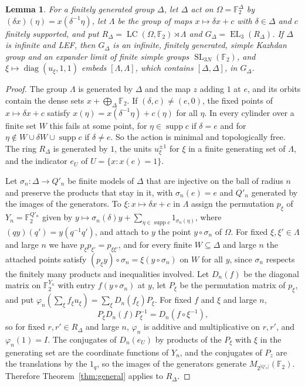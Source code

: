 \documentclass[11pt]{amsart}
\newtheorem{lemma}{Lemma}
\newcommand{\F}{\mathbb F}
\newcommand{\LC}{\operatorname{LC}}
\newcommand{\EL}{\operatorname{EL}}
\newcommand{\SL}{\operatorname{SL}}
\begin{document}
\begin{lemma}\label{lem:host}
For a finitely generated group $\Delta$, let $\Delta$ act on
$\Omega=\F_2^{\Delta}$ by $(\delta x)(\eta)=x(\delta^{-1}\eta)$, let
$\Lambda$ be the group of maps $x\mapsto\delta x+c$ with $\delta\in\Delta$
and $c$ finitely supported, and put
$R_\Delta=\LC(\Omega,\F_2)\rtimes\Lambda$ and $G_\Delta=\EL_3(R_\Delta)$.
If $\Delta$ is infinite and LEF, then $G_\Delta$ is an infinite, finitely
generated, simple Kazhdan group and an expander limit of finite simple
groups $\SL_{3N}(\F_2)$, and $\xi\mapsto\operatorname{diag}(u_\xi,1,1)$
embeds $[\Lambda,\Lambda]$, which contains $[\Delta,\Delta]$, in
$G_\Delta$.
\end{lemma}

\begin{proof}
The group $\Lambda$ is generated by $\Delta$ and the map $z$ adding $1$ at
$e$, and its orbits contain the dense sets $x+\bigoplus_\Delta\F_2$. If
$(\delta,c)\ne(e,0)$, the fixed points of $x\mapsto\delta x+c$ satisfy
$x(\eta)=x(\delta^{-1}\eta)+c(\eta)$ for all $\eta$. In every cylinder over
a finite set $W$ this fails at some point, for
$\eta\in\operatorname{supp}c$ if $\delta=e$ and for
$\eta\notin W\cup\delta W\cup\operatorname{supp}c$ if $\delta\ne e$. So the
action is minimal and topologically free. The ring $R_\Delta$ is generated
by $1$, the units $u_\xi^{\pm1}$ for $\xi$ in a finite generating set of
$\Lambda$, and the indicator $e_U$ of $U=\{x:x(e)=1\}$.

Let $\sigma_n\colon\Delta\to Q'_n$ be finite models of $\Delta$ that are
injective on the ball of radius $n$ and preserve the products that stay in
it, with $\sigma_n(e)=e$ and $Q'_n$ generated by the images of the
generators. To $\xi\colon x\mapsto\delta x+c$ in $\Lambda$ assign the
permutation $p_\xi$ of $Y_n=\F_2^{Q'_n}$ given by
$y\mapsto\sigma_n(\delta)y+\sum_{\eta\in\operatorname{supp}c}1_{\sigma_n(\eta)}$,
where $(qy)(q')=y(q^{-1}q')$, and attach to $y$ the point $y\circ\sigma_n$
of $\Omega$. For fixed $\xi,\xi'\in\Lambda$ and large $n$ we have
$p_\xi p_{\xi'}=p_{\xi\xi'}$, and for every finite $W\subseteq\Delta$ and
large $n$ the attached points satisfy
$(p_\xi y)\circ\sigma_n=\xi(y\circ\sigma_n)$ on $W$ for all $y$, since
$\sigma_n$ respects the finitely many products and inequalities involved.
Let $D_n(f)$ be the diagonal matrix on $\F_2^{Y_n}$ with entry
$f(y\circ\sigma_n)$ at $y$, let $P_\xi$ be the permutation matrix of
$p_\xi$, and put
$\varphi_n(\sum_\xi f_\xi u_\xi)=\sum_\xi D_n(f_\xi)P_\xi$. For fixed $f$
and $\xi$ and large $n$,
\[
  P_\xi D_n(f)P_\xi^{-1}=D_n(f\circ\xi^{-1}),
\]
so for fixed $r,r'\in R_\Delta$ and large $n$, $\varphi_n$ is additive and
multiplicative on $r,r'$, and $\varphi_n(1)=I$. The conjugates of
$D_n(e_U)$ by products of the $P_\xi$ with $\xi$ in the generating set are
the coordinate functions of $Y_n$,
and the conjugates of $P_z$ are the translations by the $1_q$, so the
images of the generators generate $M_{2^{|Q'_n|}}(\F_2)$. Therefore
Theorem~\ref{thm:general} applies to $R_\Delta$.


\end{proof}
\end{document}
